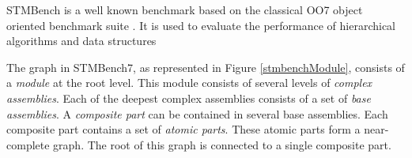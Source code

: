 STMBench is a well known benchmark based on the classical OO7 object oriented benchmark suite \cite{CareyDN93}. It is used to evaluate the performance of hierarchical algorithms and data structures \cite{prokopec_renaissance_2019,vale_pot_2016, felber_hardware_2016, carvalho_optimizing_2016, kim_scheduling_2015,filipe_nested_2015,rito_props_2014,kalikar2016domlock,anjuMID,FlexiGran2024,KalikarN18,GaneshKN18,liu_unleashing_2014} 

The graph in STMBench7, as represented in Figure \ref{stmbenchModule}, consists of a \emph{module} at the root level. This module consists of several levels of \emph{complex assemblies}. 
Each of the deepest complex assemblies consists of a set of \emph{base assemblies}. 
A \emph{composite part} can be contained in several base assemblies. 
Each composite part contains a set of \emph{atomic parts}. 
These atomic parts form a near-complete graph. 
The root of this graph is connected to a single composite part.

